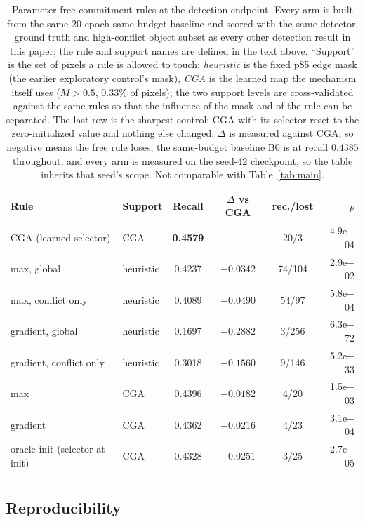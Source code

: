 \documentclass[pdflatex,sn-mathphys-num]{sn-jnl}
\theoremstyle{thmstyleone}%
\theoremstyle{thmstyletwo}%
\theoremstyle{thmstylethree}%
\begin{document}
\begin{table}[t]
\caption{Parameter-free commitment rules at the detection endpoint. Every arm is built from the same 20-epoch same-budget baseline and scored with the same detector, ground truth and high-conflict object subset as every other detection result in this paper; the rule and support names are defined in the text above. ``Support'' is the set of pixels a rule is allowed to touch: \emph{heuristic} is the fixed p85 edge mask (the earlier exploratory control's mask), \emph{CGA} is the learned map the mechanism itself uses ($M > 0.5$, $0.33\%$ of pixels); the two support levels are cross-validated against the same rules so that the influence of the mask and of the rule can be separated. The last row is the sharpest control: CGA with its selector reset to the zero-initialized value and nothing else changed. $\Delta$ is measured against CGA, so negative means the free rule loses; the same-budget baseline B0 is at recall $0.4385$ throughout, and every arm is measured on the seed-42 checkpoint, so the table inherits that seed's scope. Not comparable with Table~\ref{tab:main}.}
\label{tab:free}%
\footnotesize
\setlength{\tabcolsep}{4pt}
\begin{tabular}{@{}llcccr@{}}
\toprule
Rule & Support & Recall & $\Delta$ vs CGA & rec./lost & $p$ \\
\midrule
CGA (learned selector) & CGA & \textbf{0.4579} & --- & 20/3 & $4.9$e$-$04 \\
\midrule
max, global & heuristic & 0.4237 & $-0.0342$ & 74/104 & 2.9e$-$02 \\
max, conflict only & heuristic & 0.4089 & $-0.0490$ & 54/97 & 5.8e$-$04 \\
gradient, global & heuristic & 0.1697 & $-0.2882$ & 3/256 & 6.3e$-$72 \\
gradient, conflict only & heuristic & 0.3018 & $-0.1560$ & 9/146 & 5.2e$-$33 \\
\midrule
max & CGA & 0.4396 & $-0.0182$ & 4/20 & 1.5e$-$03 \\
gradient & CGA & 0.4362 & $-0.0216$ & 4/23 & 3.1e$-$04 \\
oracle-init (selector at init) & CGA & 0.4328 & $-0.0251$ & 3/25 & 2.7e$-$05 \\
\botrule
\end{tabular}
\end{table}

\subsection{Reproducibility}\label{sec:exp:repro}
\end{document}
